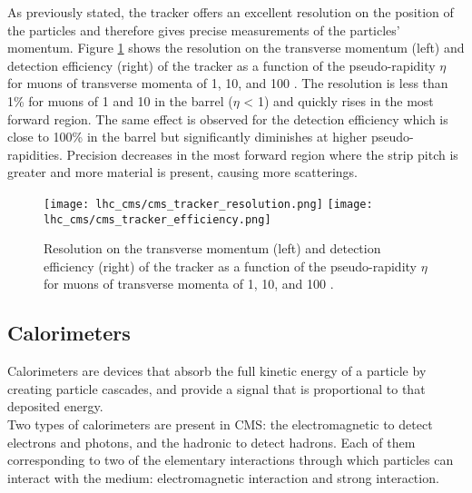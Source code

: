                As previously stated, the tracker offers an excellent resolution on the position of the particles and therefore gives precise measurements of the particles' momentum. Figure \ref{fig:lhc_and_cms__cms_tracker_performances} shows the resolution on the transverse momentum \pT{} (left) and detection efficiency (right) of the tracker as a function of the pseudo-rapidity $ \eta $ for muons of transverse momenta \pT{} of 1, 10, and 100 \GeVc{}. The resolution is less than 1\% for muons of 1 and 10 \GeVc{} in the barrel ($ \eta $ < 1) and quickly rises in the most forward region. The same effect is observed for the detection efficiency which is close to 100\% in the barrel but significantly diminishes at higher pseudo-rapidities. Precision decreases in the most forward region where the strip pitch is greater and more material is present, causing more scatterings.

                \begin{figure}[h!]
                    \centering
                    \texttt{[image: lhc\_cms/cms\_tracker\_resolution.png]}
                    \texttt{[image: lhc\_cms/cms\_tracker\_efficiency.png]}
                    \caption{Resolution on the transverse momentum \pT{} (left) and detection efficiency (right) of the tracker as a function of the pseudo-rapidity $ \eta $ for muons of transverse momenta \pT{} of 1, 10, and 100 \GeVc{} \Cite{CMS_at_LHC}.}
                    \label{fig:lhc_and_cms__cms_tracker_performances}
                \end{figure}    

        \subsection{Calorimeters}

            Calorimeters are devices that absorb the full kinetic energy of a particle by creating particle cascades, and provide a signal that is proportional to that deposited energy. \\

            Two types of calorimeters are present in CMS: the electromagnetic to detect electrons and photons, and the hadronic to detect hadrons. Each of them corresponding to two of the elementary interactions through which particles can interact with the medium: electromagnetic interaction and strong interaction. \\

